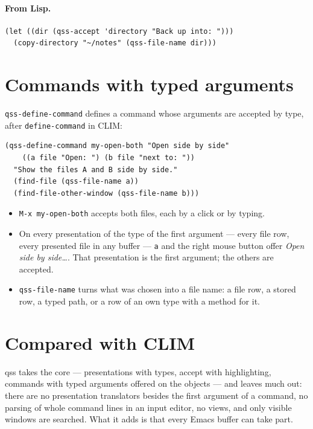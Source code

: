 \documentclass[
  paper=a4, fontsize=11pt, parskip=half, headings=small,
  toc=bibliography, numbers=noenddot, DIV=12
]{scrreprt}
\newcommand{\code}[1]{\texttt{#1}}
\newcommand{\kbd}[1]{\texttt{#1}}
\newcommand{\qss}{\textsf{qss}}
\begin{document}
\paragraph{From Lisp.}
\begin{lstlisting}
(let ((dir (qss-accept 'directory "Back up into: ")))
  (copy-directory "~/notes" (qss-file-name dir)))
\end{lstlisting}

\section{Commands with typed arguments}\label{sec:commands}

\code{qss-define-command} defines a command whose arguments are accepted by
type, after \code{define-command} in CLIM:

\begin{lstlisting}
(qss-define-command my-open-both "Open side by side"
    ((a file "Open: ") (b file "next to: "))
  "Show the files A and B side by side."
  (find-file (qss-file-name a))
  (find-file-other-window (qss-file-name b)))
\end{lstlisting}

\begin{itemize}
\item \kbd{M-x my-open-both} accepts both files, each by a click or by typing.
\item On every presentation of the type of the first argument --- every file
  row, every presented file in any buffer --- \kbd{a} and the right mouse button
  offer \emph{Open side by side\ldots}. That presentation is the first argument;
  the others are accepted.
\item \code{qss-file-name} turns what was chosen into a file name: a file row, a
  stored row, a typed path, or a row of an own type with a method for it.
\end{itemize}

\section{Compared with CLIM}

\qss{} takes the core --- presentations with types, accept with highlighting,
commands with typed arguments offered on the objects --- and leaves much out:
there are no presentation translators besides the first argument of a command,
no parsing of whole command lines in an input editor, no views, and only visible
windows are searched. What it adds is that every Emacs buffer can take part.
\end{document}
